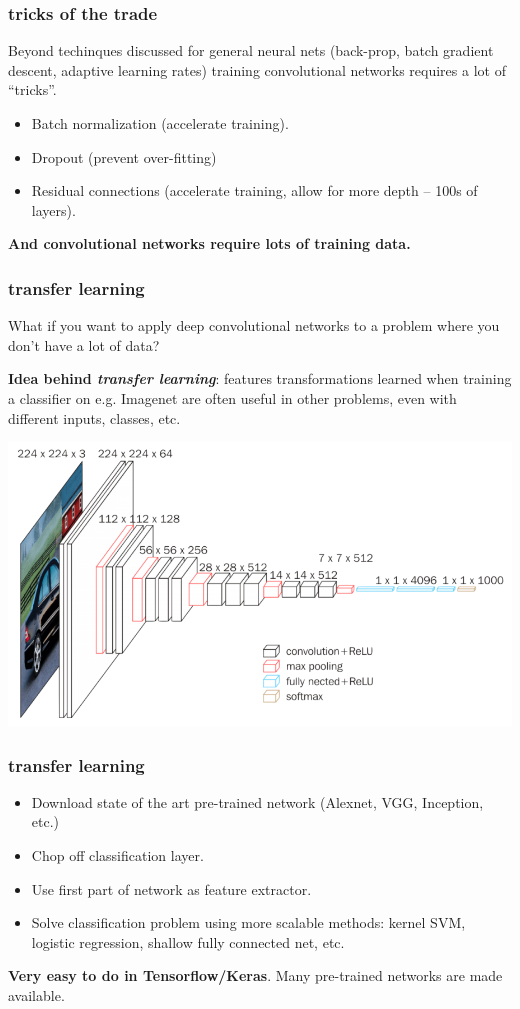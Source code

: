 \documentclass[handout,compress]{beamer}
\begin{document}
\begin{frame}
	\frametitle{tricks of the trade}\small
	Beyond techinques discussed for general neural nets (back-prop, batch gradient descent, adaptive learning rates) training convolutional networks requires a lot of ``tricks''. 
	\begin{itemize}
		\item Batch normalization (accelerate training).
		\item Dropout (prevent over-fitting)
		\item Residual connections (accelerate training, allow for more depth -- 100s of layers).
	\end{itemize}
\begin{center}
	\textbf{ And convolutional networks require \alert{lots of training data.}}
\end{center}
\end{frame}

\begin{frame}
	\frametitle{transfer learning}
	\small
	What if you want to apply deep convolutional networks to a problem where you don't have a lot of data?
	
	\textbf{Idea behind \emph{transfer learning}}: features transformations learned when training a classifier on e.g. Imagenet are often useful in other problems, even with different inputs, classes, etc. 
	\begin{center}
		\includegraphics[width=.7\textwidth]{vgg.png}
	\end{center}
\end{frame}

\begin{frame}
	\frametitle{transfer learning}
	\begin{itemize}
		\item Download state of the art pre-trained network (Alexnet, VGG, Inception, etc.)
		\item Chop off classification layer. 
		\item Use first part of network as feature extractor. 
		\item Solve classification problem using more scalable methods: kernel SVM, logistic regression, shallow fully connected net, etc.
	\end{itemize}
	\textbf{Very easy to do in Tensorflow/Keras}. Many pre-trained networks are made available. 
\end{frame}
\end{document}
